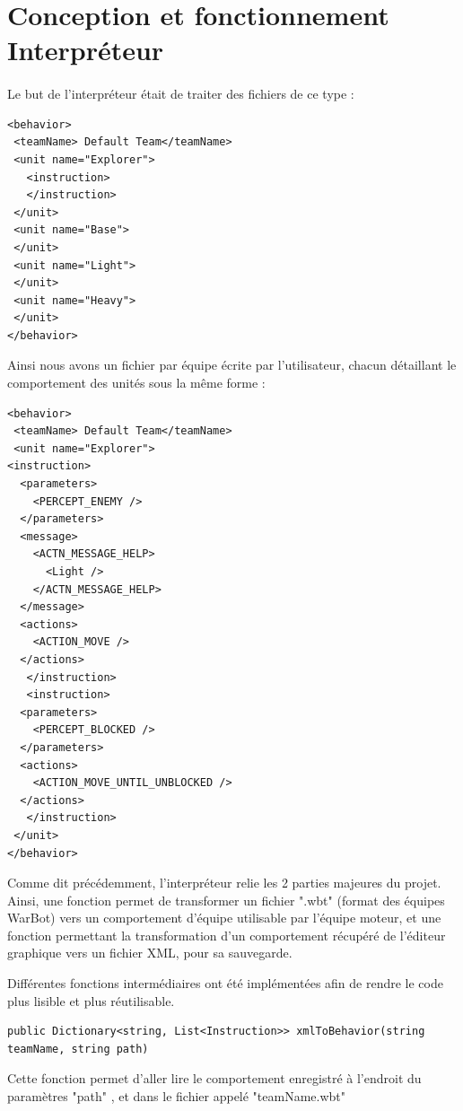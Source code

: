 \documentclass{report}
\begin{document}
\paragraph{}
\newpage

\section{Conception et fonctionnement Interpréteur}
\paragraph{}


Le but de l'interpréteur était de traiter des fichiers de ce type :
\begin{lstlisting}[frame=single]
<behavior>
 <teamName> Default Team</teamName>
 <unit name="Explorer">
   <instruction>
   </instruction>
 </unit>
 <unit name="Base">
 </unit>
 <unit name="Light">
 </unit>
 <unit name="Heavy">
 </unit>
</behavior>
\end{lstlisting}

Ainsi nous avons un fichier par équipe écrite par l'utilisateur, chacun détaillant le comportement des unités sous la même forme :

\begin{lstlisting}[frame=single]
<behavior>
 <teamName> Default Team</teamName>
 <unit name="Explorer">
<instruction>
  <parameters>
    <PERCEPT_ENEMY />
  </parameters>
  <message>
    <ACTN_MESSAGE_HELP>
      <Light />
    </ACTN_MESSAGE_HELP>
  </message>
  <actions>
    <ACTION_MOVE />
  </actions>
   </instruction>
   <instruction>
  <parameters>
    <PERCEPT_BLOCKED />
  </parameters>
  <actions>
    <ACTION_MOVE_UNTIL_UNBLOCKED />
  </actions>
   </instruction>
 </unit>
</behavior>
\end{lstlisting}

Comme dit précédemment, l'interpréteur relie les 2 parties majeures du projet.
Ainsi, une fonction permet de transformer un fichier ".wbt" (format des équipes WarBot) vers un comportement d'équipe utilisable par l'équipe moteur, et une fonction permettant la transformation d'un comportement récupéré de l'éditeur graphique vers un fichier XML, pour sa sauvegarde.

Différentes fonctions intermédiaires ont été implémentées afin de rendre le code plus lisible et plus réutilisable.
\begin{lstlisting}[frame=single]
public Dictionary<string, List<Instruction>> xmlToBehavior(string teamName, string path)
\end{lstlisting}
Cette fonction permet d'aller lire le comportement enregistré à l'endroit du paramètres "path" , et dans le fichier appelé "teamName.wbt"
\end{document}
